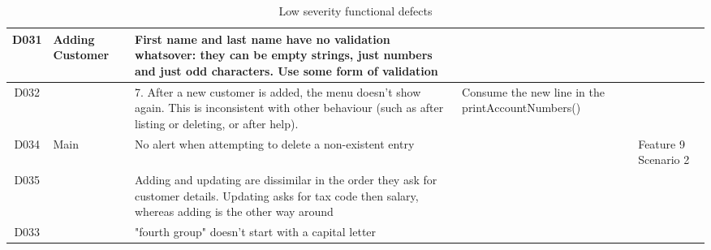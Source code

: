 \begin{table}[H]
\begin{tabularx}{\textwidth}{| c | P | X | X | P |}
D031 
& Adding Customer 
& First name and last name have no validation whatsover: they can be empty strings, just numbers and just odd characters. Use some form of validation  
&  
& \\
\hline %
D032 
&  
& 7. After a new customer is added, the menu doesn't show again. This is inconsistent with other behaviour (such as after listing or deleting, or after help).  
& Consume the new line in the printAccountNumbers()  
& \\
\hline %
D034 
& Main
& No alert when attempting to delete a non-existent entry 
&  
& Feature 9 Scenario 2\\
\hline %
D035 
&  
& Adding and updating are dissimilar in the order they ask for customer details. Updating asks for tax code then salary, whereas adding is the other way around 
&  
& \\
\hline %
D033 
&  
& "fourth group" doesn't start with a capital letter 
&  
& \\
\hline %
\end{tabularx}
\caption{Low severity functional defects}
\end{table}